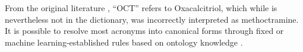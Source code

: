 \documentclass[10pt, oneside]{article}
\begin{document}
From the original literature \cite{monier199922}, ``OCT'' refers to Oxacalcitriol, which while is nevertheless not in the dictionary, was incorrectly interpreted as methoctramine. It is possible to resolve most acronyms into canonical forms through fixed or machine learning-established rules based on ontology knowledge \cite{naderi2011organismtagger}.


\small{}
\end{document}
